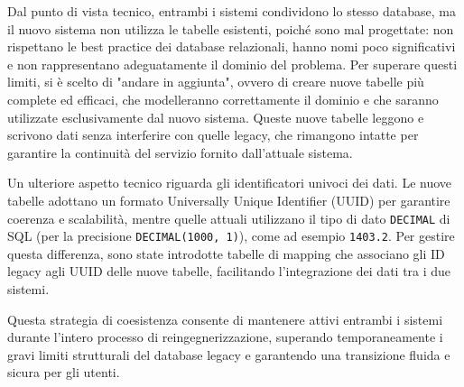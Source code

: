 Dal punto di vista tecnico, entrambi i sistemi condividono lo stesso database, ma il nuovo sistema non utilizza le tabelle esistenti, poiché sono mal progettate: non rispettano le best practice dei database relazionali, hanno nomi poco significativi e non rappresentano adeguatamente il dominio del problema. Per superare questi limiti, si è scelto di "andare in aggiunta", ovvero di creare nuove tabelle più complete ed efficaci, che modelleranno correttamente il dominio e che saranno utilizzate esclusivamente dal nuovo sistema. Queste nuove tabelle leggono e scrivono dati senza interferire con quelle legacy, che rimangono intatte per garantire la continuità del servizio fornito dall'attuale sistema.

Un ulteriore aspetto tecnico riguarda gli identificatori univoci dei dati. Le nuove tabelle adottano un formato Universally Unique Identifier (UUID) \cite{rfc4122} per garantire coerenza e scalabilità, mentre quelle attuali utilizzano il tipo di dato \texttt{DECIMAL} di SQL (per la precisione \texttt{DECIMAL(1000, 1)}), come ad esempio \texttt{1403.2}. Per gestire questa differenza, sono state introdotte tabelle di mapping che associano gli ID legacy agli UUID delle nuove tabelle, facilitando l’integrazione dei dati tra i due sistemi.

Questa strategia di coesistenza consente di mantenere attivi entrambi i sistemi durante l’intero processo di reingegnerizzazione, superando temporaneamente i gravi limiti strutturali del database legacy e garantendo una transizione fluida e sicura per gli utenti.
